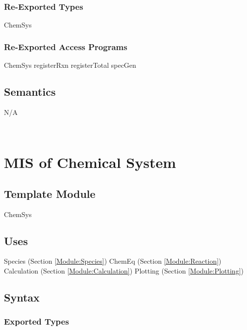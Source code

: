 \documentclass[12pt, titlepage]{article}
\begin{document}
\subsubsection{Re-Exported Types}

ChemSys

\subsubsection{Re-Exported Access Programs}

ChemSys
\newline registerRxn
\newline registerTotal
\newline specGen


\subsection{Semantics}

N/A

~\newpage

\section{MIS of Chemical System} \label{Module:ChemSys}

\subsection{Template Module}

ChemSys

\subsection{Uses}

Species (Section \ref{Module:Species})
\newline ChemEq (Section \ref{Module:Reaction})
\newline Calculation (Section \ref{Module:Calculation})
\newline Plotting (Section \ref{Module:Plotting})

\subsection{Syntax}

\subsubsection{Exported Types}
\end{document}
